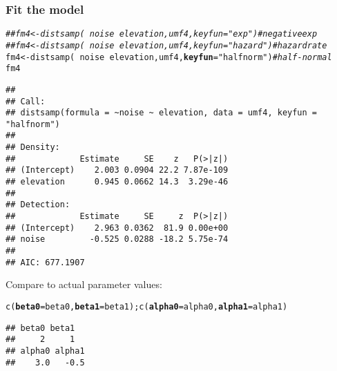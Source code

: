 \documentclass[color=usenames,dvipsnames]{beamer}\usepackage[]{graphicx}\usepackage[]{xcolor}
\makeatletter
\newcommand{\hlsng}[1]{\textcolor[rgb]{0.749,0.012,0.012}{#1}}%
\newcommand{\hlcom}[1]{\textcolor[rgb]{0.514,0.506,0.514}{\textit{#1}}}%
\newcommand{\hlopt}[1]{\textcolor[rgb]{0,0,0}{#1}}%
\newcommand{\hldef}[1]{\textcolor[rgb]{0,0,0}{#1}}%
\newcommand{\hlkwb}[1]{\textcolor[rgb]{0,0.341,0.682}{#1}}%
\newcommand{\hlkwc}[1]{\textcolor[rgb]{0,0,0}{\textbf{#1}}}%
\newcommand{\hlkwd}[1]{\textcolor[rgb]{0.004,0.004,0.506}{#1}}%
\newenvironment{kframe}{%
 \def\at@end@of@kframe{}%
 \ifinner\ifhmode%
  \def\at@end@of@kframe{\end{minipage}}%
  \begin{minipage}{\columnwidth}%
 \fi\fi%
 \def\FrameCommand##1{\hskip\@totalleftmargin \hskip-\fboxsep
 \colorbox{shadecolor}{##1}\hskip-\fboxsep
     \hskip-\linewidth \hskip-\@totalleftmargin \hskip\columnwidth}%
 \MakeFramed {\advance\hsize-\width
   \@totalleftmargin\z@ \linewidth\hsize
   \@setminipage}}%
 {\par\unskip\endMakeFramed%
 \at@end@of@kframe}
\newenvironment{knitrout}{}{} %
\makeatother
\begin{document}
\begin{frame}[fragile]
  \frametitle{Fit the model}
  \footnotesize
\begin{knitrout}\tiny
{}\color{fgcolor}\begin{kframe}
\begin{alltt}
\hlcom{## fm4 <- distsamp(~noise ~elevation, umf4, keyfun="exp")     # negative exp}
\hlcom{## fm4 <- distsamp(~noise ~elevation, umf4, keyfun="hazard")  # hazard rate}
\hldef{fm4} \hlkwb{<-} \hlkwd{distsamp}\hldef{(}\hlopt{~}\hldef{noise} \hlopt{~}\hldef{elevation, umf4,} \hlkwc{keyfun}\hldef{=}\hlsng{"halfnorm"}\hldef{)}   \hlcom{# half-normal}
\hldef{fm4}
\end{alltt}
\begin{verbatim}
## 
## Call:
## distsamp(formula = ~noise ~ elevation, data = umf4, keyfun = "halfnorm")
## 
## Density:
##             Estimate     SE    z   P(>|z|)
## (Intercept)    2.003 0.0904 22.2 7.87e-109
## elevation      0.945 0.0662 14.3  3.29e-46
## 
## Detection:
##             Estimate     SE     z  P(>|z|)
## (Intercept)    2.963 0.0362  81.9 0.00e+00
## noise         -0.525 0.0288 -18.2 5.75e-74
## 
## AIC: 677.1907
\end{verbatim}
\end{kframe}
\end{knitrout}
\pause
\vfill
Compare to actual parameter values:
\vspace{-6pt}
\begin{knitrout}\tiny
{}\color{fgcolor}\begin{kframe}
\begin{alltt}
\hlkwd{c}\hldef{(}\hlkwc{beta0}\hldef{=beta0,} \hlkwc{beta1}\hldef{=beta1);} \hlkwd{c}\hldef{(}\hlkwc{alpha0}\hldef{=alpha0,} \hlkwc{alpha1}\hldef{=alpha1)}
\end{alltt}
\begin{verbatim}
## beta0 beta1 
##     2     1
## alpha0 alpha1 
##    3.0   -0.5
\end{verbatim}
\end{kframe}
\end{knitrout}
\end{frame}
\end{document}
